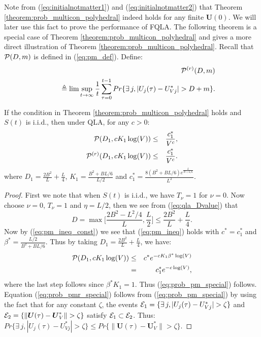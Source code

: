 \documentclass[journal]{IEEEtran}
\newcommand{\prob}{Pr}
\newcommand{\bv}[1]{{\boldsymbol{#1} }}
\newcommand{\script}[1]{{{\cal{#1} }}}
\begin{document}
Note from (\ref{eq:initialnotmatter1}) and (\ref{eq:initialnotmatter2}) that Theorem \ref{theorem:prob_multicon_polyhedral} indeed holds for any finite $\bv{U}(0)$. We will later use this fact to prove the performance of FQLA. The following theorem is a special case of Theorem  \ref{theorem:prob_multicon_polyhedral} and gives a more direct illustration of Theorem  \ref{theorem:prob_multicon_polyhedral}. Recall that $\script{P}(D,m)$ is defined in (\ref{eq:pm_def}). Define:
\begin{eqnarray}
\hspace{-.3in}&&\script{P}^{(r)}(D, m)\label{eq:pmr_def}\\
\hspace{-.3in}&&\qquad\quad\triangleq\lim\sup_{t\rightarrow\infty}\frac{1}{t}\sum_{\tau=0}^{t-1}\prob\{\exists\, j, |U_j(\tau)-U_{Vj}^*|>D+m\}.\nonumber
\end{eqnarray}
\begin{thm}\label{thm:prob_multi_con}
If the condition in Theorem  \ref{theorem:prob_multicon_polyhedral} holds and $S(t)$ is i.i.d., then under QLA, for any $c>0$:
\begin{eqnarray}
\script{P}(D_1, cK_1\log(V))&\leq& \frac{c_1^*}{V^c},\label{eq:prob_pm_special}\\
\script{P}^{(r)}(D_1, cK_1\log(V))&\leq& \frac{c_1^*}{V^c}.\label{eq:prob_pmr_special}
\end{eqnarray}
where $D_1=\frac{2B^2}{L}+\frac{L}{4}$, $K_1=\frac{B^2+BL/6}{L/2}$ and $c_1^*=\frac{8(B^2+BL/6)e^{\frac{L}{B+L/6}}}{L^2}$.
\end{thm}
\begin{proof}
First we note that when $S(t)$ is i.i.d., we have $T_{\nu}=1$ for $\nu=0$. Now choose $\nu=0$, $T_{\nu}=1$ and $\eta=L/2$, then we see from (\ref{eq:qla_Dvalue}) that 
\[D=\max\bigg[\frac{2B^2-L^2/4}{L}, \frac{L}{2}\bigg]\leq \frac{2B^2}{L}+\frac{L}{4}.\]  
Now by (\ref{eq:pm_ineq_const}) we see that (\ref{eq:pm_ineq}) holds with $c^*=c_1^*$ and $\beta^*=\frac{L/2}{B^2+BL/6}$. Thus by taking $D_1=\frac{2B^2}{L}+\frac{L}{4}$, we have:
\begin{eqnarray*}
\script{P}(D_1, cK_1\log(V))&\leq& c^*e^{-cK_1\beta^*\log(V)}\\
&=&c_1^*e^{-c\log(V)},
\end{eqnarray*}
where the last step follows since $\beta^*K_1=1$. Thus (\ref{eq:prob_pm_special}) follows. Equation (\ref{eq:prob_pmr_special}) follows from (\ref{eq:prob_pm_special}) by using the fact that for any constant $\zeta$, the events $\script{E}_1=\{\exists\, j, |U_j(\tau)-U_{Vj}^*|>\zeta\}$ and $\script{E}_2=\{\|\bv{U}(\tau)-\bv{U}_{V}^*\|>\zeta\}$ satisfy $\script{E}_1\subset\script{E}_2$. Thus:
$\prob\{\exists\, j, |U_j(\tau)-U_{Vj}^*|>\zeta\}\leq \prob\{ \|\bv{U}(\tau)-\bv{U}_{V}^*\|>\zeta\}.$
\end{proof}
\end{document}
